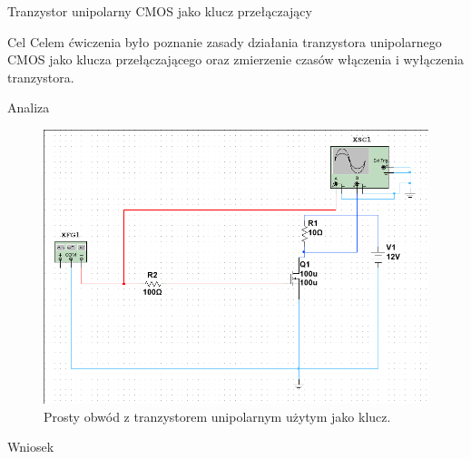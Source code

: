 \documentclass[a4paper]{scrartcl}
\begin{document}
	\begin{section}{Tranzystor unipolarny CMOS jako klucz przełączający}

		\begin{subsection}{Cel}
			Celem ćwiczenia było poznanie zasady działania tranzystora unipolarnego CMOS jako klucza przełączającego oraz zmierzenie czasów włączenia i wyłączenia tranzystora.
		\end{subsection}
		\begin{subsection}{Analiza}
				\begin{figure}[ht]
				\begin{center}
					\includegraphics[width=0.5\linewidth,scale=2]{exercise-5-circuit}
					\caption{Prosty obwód z tranzystorem unipolarnym użytym jako klucz.}
					\label{fig:circuit-3}
				\end{center}
				\end{figure}
		\end{subsection}
		\begin{subsection}{Wniosek}
		\end{subsection}
	\end{section}
\end{document}
